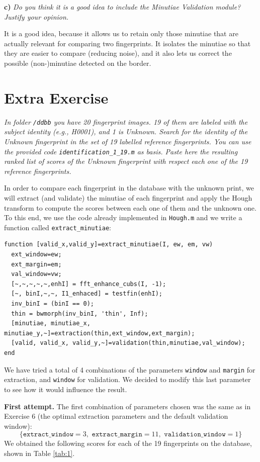 \documentclass[11pt]{article}
\begin{document}
\textbf{c) }\emph{Do you think it is a good idea to include the Minutiae Validation module? Justify your opinion.}

It is a good idea, because it allows us to retain only those minutiae that are actually relevant for comparing two fingerprints. It isolates the minutiae so that they are easier to compare (reducing noise), and it also lets us correct the possible (non-)minutiae detected on the border.

\newpage
\section*{Extra Exercise}

\emph{In folder \texttt{/ddbb} you have 20 fingerprint images. 19 of them are labeled with the subject identity (e.g., H0001), and 1 is Unknown. Search for the identity of the Unknown fingerprint in the set of 19 labelled reference fingerprints. You can use the provided code \texttt{identification\_1\_19.m} as basis. Paste here the resulting ranked list of scores of the Unknown fingerprint with respect each one of the 19 reference fingerprints.}

In order to compare each fingerprint in the database with the unknown print, we will extract (and validate) the minutiae of each fingerprint and apply the Hough transform to compute the scores between each one of them and the unknown one. To this end, we use the code already implemented in \verb|Hough.m| and we write a function called \verb|extract_minutiae|:

\begin{verbatim}
function [valid_x,valid_y]=extract_minutiae(I, ew, em, vw)
  ext_window=ew;
  ext_margin=em;
  val_window=vw;
  [~,~,~,~,~,enhI] = fft_enhance_cubs(I, -1);
  [~, binI,~,~, I1_enhaced] = testfin(enhI);
  inv_binI = (binI == 0);
  thin = bwmorph(inv_binI, 'thin', Inf);
  [minutiae, minutiae_x, minutiae_y,~]=extraction(thin,ext_window,ext_margin);
  [valid, valid_x, valid_y,~]=validation(thin,minutiae,val_window);
end
\end{verbatim}

We have tried a total of 4 combinations of the parameters \verb|window| and \verb|margin| for extraction, and \verb|window| for validation. We decided to modify this last parameter to see how it would influence the result.

\textbf{First attempt.} The first combination of parameters chosen was the same as in Exercise 6 (the optimal extraction parameters and the default validation window):
\[
\{\texttt{extract\_window}=3, \texttt{ extract\_margin}=11, \texttt{ validation\_window}=1\}
\]
We obtained the following scores for each of the 19 fingerprints on the database, shown in Table \ref{tab:1}.
\end{document}
